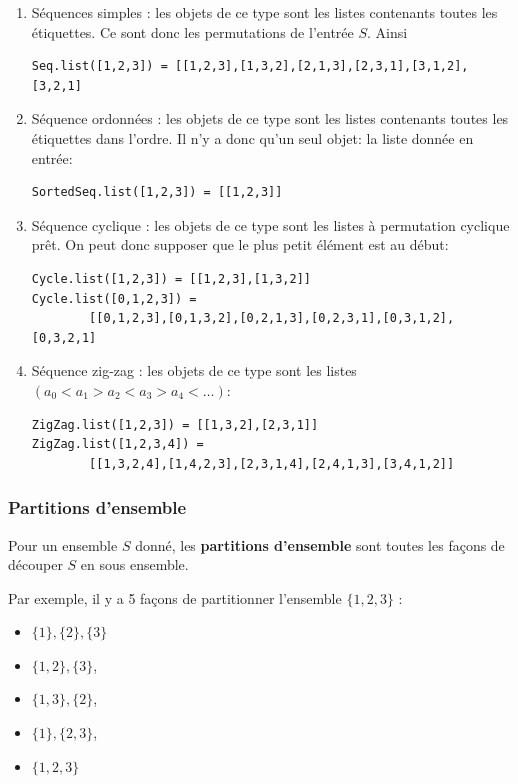 \documentclass[11pt]{article}
\renewcommand{\emph}[1]{\textbf{#1}}
\begin{document}
\begin{enumerate}
\item Séquences simples : les objets de ce type sont les listes contenants
  toutes les étiquettes. Ce sont donc les permutations de l'entrée $S$. Ainsi
\begin{verbatim}
Seq.list([1,2,3]) = [[1,2,3],[1,3,2],[2,1,3],[2,3,1],[3,1,2],[3,2,1]
\end{verbatim}
\item Séquence ordonnées : les objets de ce type sont les listes contenants
  toutes les étiquettes dans l'ordre. Il n'y a donc qu'un seul objet: la liste
  donnée en entrée:
\begin{verbatim}
SortedSeq.list([1,2,3]) = [[1,2,3]]
\end{verbatim}
\item Séquence cyclique : les objets de ce type sont les listes à permutation
  cyclique prêt. On peut donc supposer que le plus petit élément est au début:
\begin{verbatim}
Cycle.list([1,2,3]) = [[1,2,3],[1,3,2]]
Cycle.list([0,1,2,3]) =
        [[0,1,2,3],[0,1,3,2],[0,2,1,3],[0,2,3,1],[0,3,1,2],[0,3,2,1]
\end{verbatim}
\item Séquence zig-zag : les objets de ce type sont les listes
  $(a_0<a_1>a_2<a_3>a_4<\dots)$:
\begin{verbatim}
ZigZag.list([1,2,3]) = [[1,3,2],[2,3,1]]
ZigZag.list([1,2,3,4]) =
        [[1,3,2,4],[1,4,2,3],[2,3,1,4],[2,4,1,3],[3,4,1,2]]
\end{verbatim}
\end{enumerate}

\subsubsection{Partitions d'ensemble}
\label{seq:set-partitions}

Pour un ensemble $S$ donné, les \emph{partitions d'ensemble} sont toutes
les façons de découper $S$ en sous ensemble.

Par exemple, il y a 5 façons de partitionner l'ensemble $\lbrace 1,2,3 \rbrace$ :

\begin{itemize}
\item $\lbrace 1 \rbrace, \lbrace 2 \rbrace, \lbrace 3 \rbrace$
\item $\lbrace 1,2 \rbrace, \lbrace 3 \rbrace$,
\item $\lbrace 1,3 \rbrace, \lbrace 2 \rbrace$,
\item $\lbrace 1 \rbrace, \lbrace 2,3 \rbrace$,
\item $\lbrace 1,2,3 \rbrace$
\end{itemize}
\end{document}
